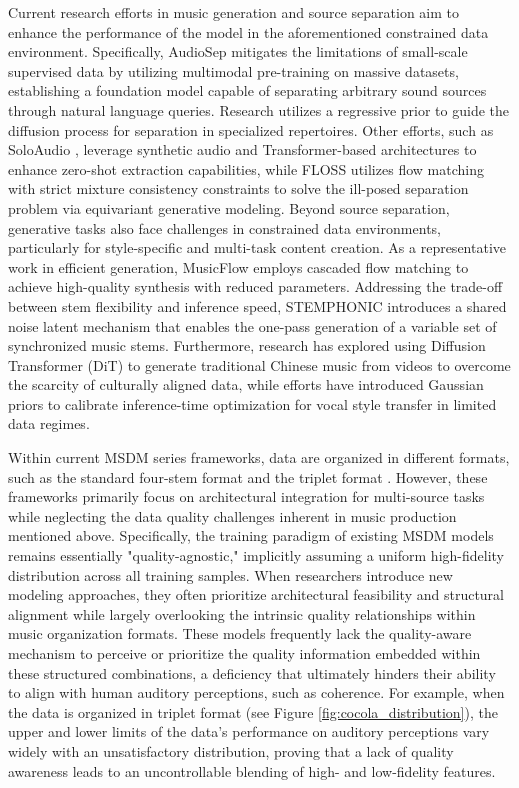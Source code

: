 \documentclass[lettersize,journal]{IEEEtran}
\begin{document}
Current research efforts in music generation and source separation aim to enhance the performance of the model in the aforementioned constrained data environment. Specifically,  AudioSep \cite{liu2024separate} mitigates the limitations of small-scale supervised data by utilizing multimodal pre-training on massive datasets, establishing a foundation model capable of separating arbitrary sound sources through natural language queries. Research \cite{plaja2025leveraging} utilizes a regressive prior to guide the diffusion process for separation in specialized repertoires. Other efforts, such as SoloAudio \cite{wang2025soloaudio}, leverage synthetic audio and Transformer-based architectures to enhance zero-shot extraction capabilities, while FLOSS \cite{scheibler2025source} utilizes flow matching with strict mixture consistency constraints to solve the ill-posed separation problem via equivariant generative modeling. 
Beyond source separation, generative tasks also face challenges in constrained data environments, particularly for style-specific and multi-task content creation. As a representative work in efficient generation, MusicFlow \cite{prajwal2024musicflow} employs cascaded flow matching to achieve high-quality synthesis with reduced parameters. Addressing the trade-off between stem flexibility and inference speed, STEMPHONIC \cite{wu2026stemphonic} introduces a shared noise latent mechanism that enables the one-pass generation of a variable set of synchronized music stems. Furthermore, research \cite{cao2025ai} has explored using Diffusion Transformer (DiT) to generate traditional Chinese music from videos to overcome the scarcity of culturally aligned data, while \cite{yu2025improving} efforts have introduced Gaussian priors to calibrate inference-time optimization for vocal style transfer in limited data regimes.

Within current MSDM series frameworks, data are organized in different formats, such as the standard four-stem format \cite{mariani2023multi} and the triplet format \cite{chae2025mge}. However, these frameworks primarily focus on architectural integration for multi-source tasks while neglecting the data quality challenges inherent in music production mentioned above. Specifically, the training paradigm of existing MSDM models remains essentially "quality-agnostic," implicitly assuming a uniform high-fidelity distribution across all training samples. When researchers introduce new modeling approaches, they often prioritize architectural feasibility and structural alignment while largely overlooking the intrinsic quality relationships within music organization formats. These models frequently lack the quality-aware mechanism to perceive or prioritize the quality information embedded within these structured combinations, a deficiency that ultimately hinders their ability to align with human auditory perceptions, such as coherence. For example, when the data is organized in triplet format (see Figure \ref{fig:cocola_distribution}), the upper and lower limits of the data's performance on auditory perceptions vary widely with an unsatisfactory distribution, proving that a lack of quality awareness leads to an uncontrollable blending of high- and low-fidelity features.
 
\end{document}
